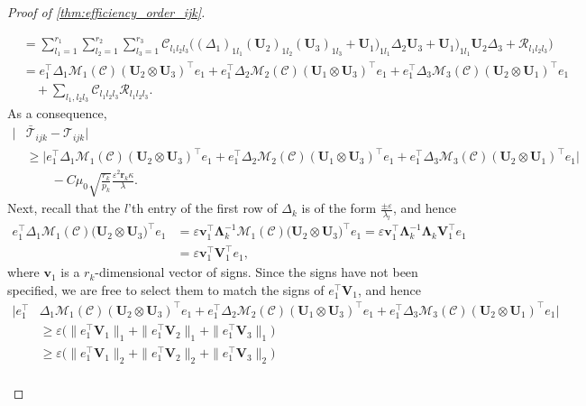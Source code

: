 \documentclass[10pt]{article}
\newcommand{\0}{{\mathbf{0}}}
\newcommand{\1}{{\mathbf{1}}}
\newcommand{\U}{{\mathbf{U}}}
\renewcommand{\t}{^{\top}}
\newcommand{\eps}{\varepsilon}
\newcommand{\inv}{^{-1}}
\begin{document}
\begin{proof}[Proof of \cref{thm:efficiency_order_ijk}]
\begin{itemize}
\begin{align*}
     &= \sum_{l_1=1}^{r_1} \sum_{l_2=1}^{r_2} \sum_{l_3=1}^{r_3} \mathcal{C}_{l_1 l_2 l_3} \bigg( (\Delta_1)_{1l_1} (\U_2)_{1l_2} (\U_3)_{1l_3} + \U_1)_{1l_1} \Delta_2  \U_3 + \U_1)_{1l_1} \U_2 \Delta_3 + \mathcal{R}_{l_1l_2l_3} \bigg) \\
     &= e_1\t \Delta_1 \mathcal{M}_1(\mathcal{C}) (\U_2 \otimes \U_3)\t e_1 + e_1\t \Delta_2 \mathcal{M}_2(\mathcal{C}) (\U_1 \otimes \U_3)\t e_1 +
     e_1\t \Delta_3 \mathcal{M}_3(\mathcal{C}) (\U_2 \otimes \U_1)\t e_1 \\
     &\quad + \sum_{l_1,l_2l_3}\mathcal{C}_{l_1l_2l_3} \mathcal{R}_{l_1l_2l_3}.
\end{align*}
As a consequence,
\begin{align*}
  \bigg|   &\mathcal{\bar T}_{ijk} - \mathcal{T}_{ijk} \bigg| \\&\geq \bigg| e_1\t \Delta_1 \mathcal{M}_1(\mathcal{C}) (\U_2 \otimes \U_3)\t e_1 + e_1\t \Delta_2 \mathcal{M}_2(\mathcal{C}) (\U_1 \otimes \U_3)\t e_1 +
     e_1\t \Delta_3 \mathcal{M}_3(\mathcal{C}) (\U_2 \otimes \U_1)\t e_1 \bigg| \\
     &\qquad - C \mu_0 \sqrt{\frac{r_k}{p_k}} \frac{\eps^2 \mathbf{r}_k \kappa}{\lambda}.
\end{align*}
Next, recall that the $l$'th entry  of the first row of   $\Delta_k$ is of the form $\frac{\pm \eps}{\lambda_l}$, and hence
\begin{align*}
    e_1\t \Delta_1 \mathcal{M}_1(\mathcal{C}) \big( \U_2 \otimes \U_3 \big)\t e_1 &= \eps \mathbf{v}_1\t \mathbf{\Lambda}_k\inv \mathcal{M}_1(\mathcal{C}) \big( \U_2 \otimes \U_3 \big)\t e_1 = \eps \mathbf{v}_1\t \mathbf{\Lambda}_k\inv \mathbf{\Lambda}_k \mathbf{V}_1\t e_1 \\
    &= \eps  \mathbf{v}_1\t \mathbf{V}_1\t e_1,
\end{align*}
where $\mathbf{v}_1$ is a $r_k$-dimensional vector of signs.  Since the signs have not been specified, we are free to select them to match the signs of $e_1\t \mathbf{V}_1$, and hence
\begin{align*}
    \bigg| e_1\t &\Delta_1 \mathcal{M}_1(\mathcal{C}) (\U_2 \otimes \U_3)\t e_1 + e_1\t \Delta_2 \mathcal{M}_2(\mathcal{C}) (\U_1 \otimes \U_3)\t e_1 +
     e_1\t \Delta_3 \mathcal{M}_3(\mathcal{C}) (\U_2 \otimes \U_1)\t e_1 \bigg| \\
     &\geq \eps \bigg( \| e_1 \t \mathbf{V}_1 \|_1 + \| e_1 \t \mathbf{V}_2 \|_1 +\| e_1 \t \mathbf{V}_3 \|_1\bigg) \\
     &\geq \eps \bigg( \| e_1 \t \mathbf{V}_1 \|_2 + \| e_1 \t \mathbf{V}_2 \|_2 +\| e_1 \t \mathbf{V}_3 \|_2\bigg) \\

\end{align*}
\end{itemize}
\end{proof}
\end{document}
